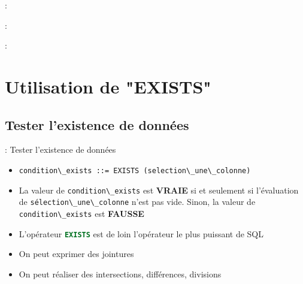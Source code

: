 \documentclass[10pt]{beamer}
\begin{document}
\begin{frame}{\secname : \subsecname}
    
\end{frame}

\begin{frame}{\secname : \subsecname}
    
\end{frame}

\begin{frame}{\secname : \subsecname}
    
\end{frame}

\section{Utilisation de "EXISTS"}
\tocss
\subsection{Tester l'existence de données}

\begin{frame}{\secname : \subsecname}
    Tester l'existence de données
    \begin{itemize}
        \item \lstinline[language=bnf]!condition\_exists ::= EXISTS (selection\_une\_colonne)!
        \item La valeur de \lstinline[language=bnf]!condition\_exists! est \textbf{VRAIE} si et seulement si l'évaluation de \lstinline[language=bnf]!sélection\_une\_colonne! n'est pas vide.  Sinon, la valeur de \lstinline[language=bnf]!condition\_exists! est \textbf{FAUSSE}
        \item L'opérateur \lstinline[language=sql]!EXISTS! est de loin l'opérateur le plus puissant de SQL
        \item On peut exprimer des jointures
        \item On peut réaliser des intersections, différences, divisions
    \end{itemize}
\end{frame}
\end{document}
